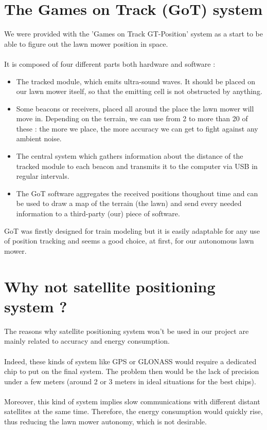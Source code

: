 \section{The Games on Track (GoT) system}
We were provided with the 'Games on Track GT-Position' system as a start to be able to figure out the lawn mower position in space.\\\\
It is composed of four different parts both hardware and software :
\begin{itemize}
	\item The tracked module, which emits ultra-sound waves. It should be placed on our lawn mower itself, so that the emitting cell is not obstructed by anything.
	\item Some beacons or receivers, placed all around the place the lawn mower will move in. Depending on the terrain, we can use from 2 to more than 20 of these : the more we place, the more accuracy we can get to fight against any ambient noise.
	\item The central system which gathers information about the distance of the tracked module to each beacon and transmits it to the computer via USB in regular intervals.
	\item The GoT software aggregates the received positions thoughout time and can be used to draw a map of the terrain (the lawn) and send every needed information to a third-party (our) piece of software.
\end{itemize}
GoT was firstly designed for train modeling but it is easily adaptable for any use of position tracking and seems a good choice, at first, for our autonomous lawn mower.

\section{Why not satellite positioning system ?}
The reasons why satellite positioning system won't be used in our project are mainly related to accuracy and energy consumption.\\\\
Indeed, these kinds of system like GPS or GLONASS would require a dedicated chip to put on the final system. The problem then would be the lack of precision under a few meters (around 2 or 3 meters in ideal situations for the best chips). \\\\
Moreover, this kind of system implies slow communications with different distant satellites at the same time. Therefore, the energy consumption would quickly rise, thus reducing the lawn mower autonomy, which is not desirable.

